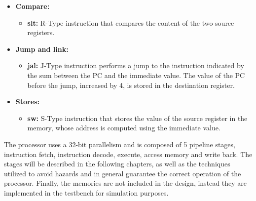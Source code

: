 \begin{itemize}
    \item \textbf{Compare:}
    \begin{itemize}
        \item \textbf{slt:} R-Type instruction that compares the content of the two source registers.
    \end{itemize}
    \item \textbf{Jump and link:}
    \begin{itemize}
        \item \textbf{jal:} J-Type instruction performs a jump to the instruction indicated by the sum between the PC and the immediate value. The value of the PC before the jump, 
        increased by 4, is stored in the destination register.
    \end{itemize}
    \item \textbf{Stores:}
    \begin{itemize}
        \item \textbf{sw:} S-Type instruction that stores the value of the source register in the memory, whose address is computed using the immediate value.
    \end{itemize}
\end{itemize}

    The processor uses a 32-bit parallelism and is composed of 5 pipeline stages, instruction fetch, instruction decode, execute, access memory and write back.
    The stages will be described in the following chapters, as well as the techniques utilized to avoid hazards and in general guarantee the correct operation of the processor. 
    Finally, the memories are not included in the design, instead they are implemented in the testbench for simulation purposes.